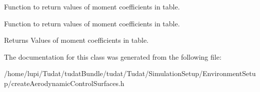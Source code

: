 Function to return values of moment coefficients in table. 

Function to return values of moment coefficients in table. \begin{DoxyReturn}{Returns}
Values of moment coefficients in table. 
\end{DoxyReturn}


The documentation for this class was generated from the following file\+:\begin{DoxyCompactItemize}
\item 
/home/lupi/\+Tudat/tudat\+Bundle/tudat/\+Tudat/\+Simulation\+Setup/\+Environment\+Setup/create\+Aerodynamic\+Control\+Surfaces.\+h\end{DoxyCompactItemize}
